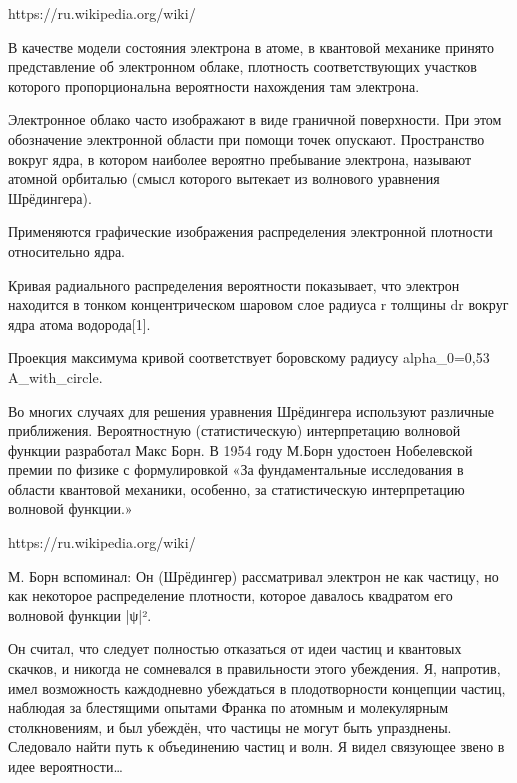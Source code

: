 https://ru.wikipedia.org/wiki/%
{
В качестве модели состояния электрона в атоме, в квантовой механике принято представление об электронном облаке, плотность соответствующих участков которого пропорциональна вероятности нахождения там электрона.

Электронное облако часто изображают в виде граничной поверхности. При этом обозначение электронной области при помощи точек опускают. Пространство вокруг ядра, в котором наиболее вероятно пребывание электрона, называют атомной орбиталью (смысл которого вытекает из волнового уравнения Шрёдингера).

Применяются графические изображения распределения электронной плотности относительно ядра.

Кривая радиального распределения вероятности показывает, что электрон находится в тонком концентрическом шаровом слое радиуса r толщины dr вокруг ядра атома водорода[1].

Проекция максимума кривой соответствует боровскому радиусу alpha_0=0,53 A_with_circle.

Во многих случаях для решения уравнения Шрёдингера используют различные приближения. Вероятностную (статистическую) интерпретацию волновой функции разработал Макс Борн. В 1954 году М.Борн удостоен Нобелевской премии по физике с формулировкой «За фундаментальные исследования в области квантовой механики, особенно, за статистическую интерпретацию волновой функции.»
}

https://ru.wikipedia.org/wiki/%
{
М. Борн вспоминал:
Он (Шрёдингер) рассматривал электрон не как частицу, но как некоторое распределение плотности, которое давалось квадратом его волновой функции |ψ|².

Он считал, что следует полностью отказаться от идеи частиц и квантовых скачков, и никогда не сомневался в правильности этого убеждения. Я, напротив, имел возможность каждодневно убеждаться в плодотворности концепции частиц, наблюдая за блестящими опытами Франка по атомным и молекулярным столкновениям, и был убеждён, что частицы не могут быть упразднены. Следовало найти путь к объединению частиц и волн. Я видел связующее звено в идее вероятности…
}





